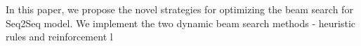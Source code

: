 \documentclass[11pt,a4paper]{article}
\begin{document}
In this paper, we propose the novel strategies for optimizing the beam search for Seq2Seq model. We implement the two dynamic beam search methods - heuristic rules and reinforcement l






\end{document}
